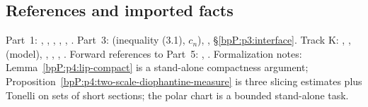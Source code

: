 \subsection{References and imported facts}\label{bpP:p4:forward}
Part~1: , , , , , . Part~3:  (inequality (3.1), $c_n$), , \S\ref{bpP:p3:interface}. Track K: , ,  (model), , , , . Forward references to Part~5: , . Formalization notes: Lemma~\ref{bpP:p4:lip-compact} is a stand-alone compactness argument; Proposition~\ref{bpP:p4:two-scale-diophantine-measure} is three slicing estimates plus Tonelli on sets of short sections; the polar chart is a bounded stand-alone task.
